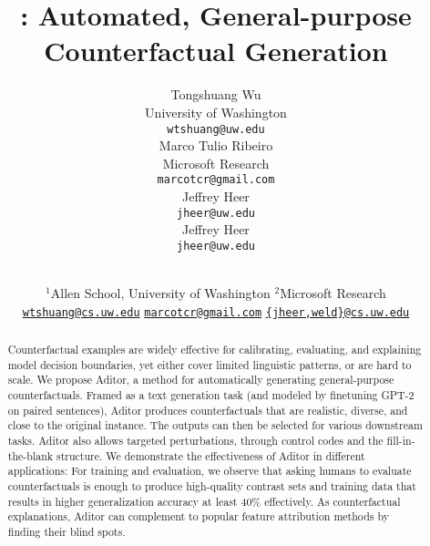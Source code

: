 \documentclass[11pt,a4paper]{article}
\title{\sysname: Automated, General-purpose Counterfactual Generation}
\author{
Tongshuang Wu \\
  University of Washington \\
  \texttt{wtshuang@uw.edu} \\\And
Marco Tulio Ribeiro \\
  Microsoft Research \\
  \texttt{marcotcr@gmail.com} \\\And
Jeffrey Heer \\
  \texttt{jheer@uw.edu} \\\And
Jeffrey Heer \\
  \texttt{jheer@uw.edu} \\
}
\author{
\makecell{
Tongshuang Wu$^{1}$ ~~~~~~~ 
Marco Tulio Ribeiro$^{2}$ ~~~~~~~ 
Jeffrey Heer$^{1}$ ~~~~~ 
Daniel S. Weld$^{1}$}  \\ 
$^{1}$Allen School, University of Washington\hspace{5mm}
$^{2}$Microsoft Research\hspace{5mm} \\ 
\href{mailto:wtshuang@cs.uw.edu}{\texttt {wtshuang@cs.uw.edu}}
\hspace{2mm}
\href{mailto:marcotcr@microsoft.com}{\texttt {marcotcr@gmail.com}}
\hspace{2mm}
\href{mailto:dan@cs.washington.edu}{\texttt {\{jheer,weld\}@cs.uw.edu}}
}
\date{}
\newcommand{\sysname}{{\color{red}Aditor}\xspace}
\newcommand{\tagstrs}{control codes\xspace}
\begin{document}
\maketitle
\begin{abstract}
Counterfactual examples are widely effective for calibrating, evaluating, and explaining model decision boundaries, yet either cover limited linguistic patterns, or are hard to scale.
We propose \sysname, a method for automatically generating general-purpose counterfactuals. 
Framed as a text generation task (and modeled by finetuning GPT-2 on paired sentences), \sysname produces counterfactuals that are  realistic, diverse, and close to the original instance.
The outputs can then be selected for various downstream tasks. 
\sysname also allows targeted perturbations, through \tagstrs and the fill-in-the-blank structure.
We demonstrate the effectiveness of \sysname in different applications:
For training and evaluation, we observe that asking humans to evaluate counterfactuals is enough to produce high-quality contrast sets and training data that results in higher generalization accuracy at least 40\% effectively.
As counterfactual explanations, \sysname can complement to popular feature attribution methods by finding their blind spots.
\end{abstract}


%









\clearpage
\newpage

\appendix







\end{document}
